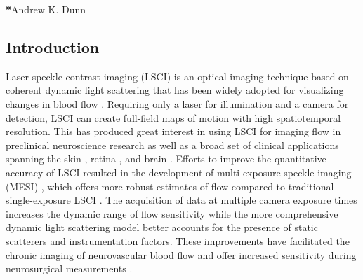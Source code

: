 \documentclass[12pt]{spieman}
\begin{document}

{\noindent \footnotesize\textbf{*}Andrew K. Dunn }

\begin{spacing}{2}


\section{Introduction}
\label{sect:introduction}

Laser speckle contrast imaging (LSCI) is an optical imaging technique based on coherent dynamic light scattering that has been widely adopted for visualizing changes in blood flow \cite{Briers:2001hy,Boas:2010vr}. Requiring only a laser for illumination and a camera for detection, LSCI can create full-field maps of motion with high spatiotemporal resolution. This has produced great interest in using LSCI for imaging flow in preclinical neuroscience research \cite{Ayata:2004ba,Durduran.2004,Nakamura:2010wp,He:2020} as well as a broad set of clinical applications spanning the skin \cite{Roustit.2010,Mahe.2012}, retina \cite{Briers.1982,Feng.2022}, and brain \cite{Parthasarathy:2010gh,Klijn:2012ls,Miller.2022}. Efforts to improve the quantitative accuracy of LSCI resulted in the development of multi-exposure speckle imaging (MESI) \cite{Parthasarathy:2008el}, which offers more robust estimates of flow compared to traditional single-exposure LSCI \cite{Parthasarathy:2010vo,Kazmi:2013hp}. The acquisition of data at multiple camera exposure times increases the dynamic range of flow sensitivity while the more comprehensive dynamic light scattering model better accounts for the presence of static scatterers and instrumentation factors. These improvements have facilitated the chronic imaging of neurovascular blood flow \cite{Schrandt:2015gu,Clark:20194vi,Williamson.2020,Sullender.2022} and offer increased sensitivity during neurosurgical measurements \cite{Richards:2017df}.


\end{spacing}
\end{document}
